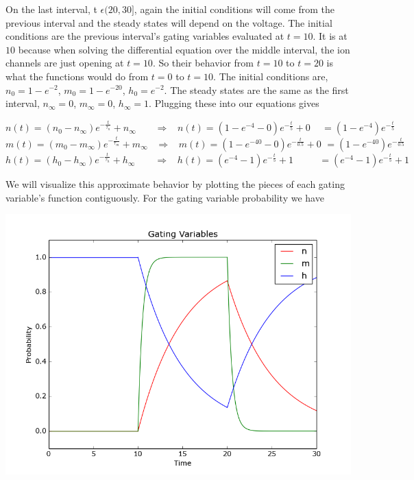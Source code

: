 \documentclass[letterpaper,10pt,english]{/usr/share/sphinx/texinputs/sphinxhowto}
\begin{document}
On the last interval, t $\epsilon (20,30]$, again the initial conditions
will come from the previous interval and the steady states will depend
on the voltage. The initial conditions are the previous interval's
gating variables evaluated at $t=10$. It is at $10$ because when solving
the differential equation over the middle interval, the ion channels are
just opening at $t=10$. So their behavior from $t=10$ to $t=20$ is what
the functions would do from $t=0$ to $t=10$. The initial conditions are,
$n_0=1-e^{-2}$, $m_0=1-e^{-20}$, $h_0=e^{-2}$. The steady states are the
same as the first interval, $n_{\infty}=0$, $m_{\infty}=0$,
$h_{\infty}=1$. Plugging these into our equations gives

\[n(t) = (n_0-n_{\infty})e^{-\frac{t}{\tau_n}}+n_{\infty} \hspace{23pt} \Rightarrow \hspace{10pt} n(t) = (1-e^{-4}-0)e^{-\frac{t}{5}}+0 \hspace{14pt} = (1-e^{-4})e^{-\frac{t}{5}}\]
\[m(t) = (m_0-m_{\infty})e^{-\frac{t}{\tau_m}}+m_{\infty} \hspace{10pt} \Rightarrow \hspace{10pt} m(t) = (1-e^{-40}-0)e^{-\frac{t}{0.5}}+0 \hspace{4pt} = (1-e^{-40})e^{-\frac{t}{0.5}}\]
\[h(t) = (h_0-h_{\infty})e^{-\frac{t}{\tau_h}}+h_{\infty} \hspace{24pt} \Rightarrow \hspace{10pt} h(t) = (e^{-4}-1)e^{-\frac{t}{5}}+1 \hspace{32pt} = (e^{-4}-1)e^{-\frac{t}{5}}+1\]

We will visualize this approximate behavior by plotting the pieces of
each gating variable's function contiguously. For the gating variable
probability we have

\includegraphics[scale=0.5]{gv.png}
\end{document}
